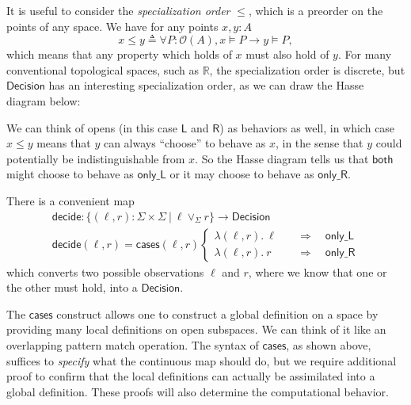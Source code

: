 \documentclass{article}           %
\newcommand{\R}{\mathbb{R}}
\newcommand{\fun}[2]{\lambda {#1}.\  {#2}}
\newcommand{\suchthat}{\ |\ }
\newcommand{\Open}[1]{\mathcal{O}({#1})}
\newcommand{\defeq}{\triangleq}
\begin{document}
It is useful to consider the \emph{specialization order} $\le$, which is a preorder on the points of any space. We have for any points $x, y : A$
\[
x \le y \defeq \forall P : \Open{A}, x \models P \to y \models P,
\]
which means that any property which holds of $x$ must also hold of $y$. For many conventional topological spaces, such as $\R$, the specialization order is discrete, but $\mathsf{Decision}$ has an interesting specialization order, as we can draw the Hasse diagram below:
\begin{center}
\end{center}

We can think of opens (in this case $\mathsf{L}$ and $\mathsf{R}$) as behaviors as well, in which case $x \le y$ means that $y$ can always ``choose'' to behave as $x$, in the sense that $y$ could potentially be indistinguishable from $x$. So the Hasse diagram tells us that $\mathsf{both}$ might choose to behave as $\mathsf{only\_L}$ or it may choose to behave as $\mathsf{only\_R}$.

There is a convenient map
\begin{align*}
\mathsf{decide} : \{ (\ell, r) : \Sigma \times \Sigma \suchthat \ell \vee_\Sigma r \} \to \mathsf{Decision}
\\ \mathsf{decide}(\ell, r) = \mathsf{cases}(\ell, r)
\begin{cases}
\fun{(\ell, r)}{\ell}
  \quad &\Longrightarrow \quad \mathsf{only\_L}
\\
\fun{(\ell, r)}{r}
  \quad &\Longrightarrow \quad \mathsf{only\_R}
\end{cases}
\end{align*}
which converts two possible observations $\ell$ and $r$, where we know that one or the other must hold, into a $\mathsf{Decision}$. 

The $\mathsf{cases}$ construct allows one to construct a global definition on a space by providing many local definitions on open subspaces. We can think of it like an overlapping pattern match operation. The syntax of $\mathsf{cases}$, as shown above, suffices to \emph{specify} what the continuous map should do, but we require additional proof to confirm that the local definitions can actually be assimilated into a global definition. These proofs will also determine the computational behavior.
\end{document}
